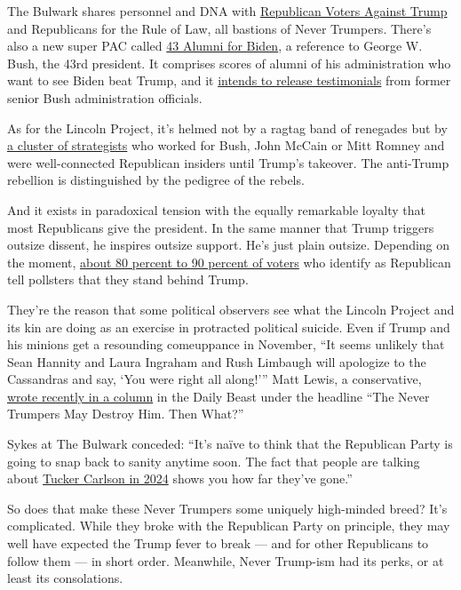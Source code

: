 The Bulwark shares personnel and DNA with
\href{https://rvat.org/}{Republican Voters Against Trump} and
Republicans for the Rule of Law, all bastions of Never Trumpers. There's
also a new super PAC called \href{https://43alumniforjoebiden.com/}{43
Alumni for Biden}, a reference to George W. Bush, the 43rd president. It
comprises scores of alumni of his administration who want to see Biden
beat Trump, and it
\href{https://www.reuters.com/article/us-usa-election-biden-republicans-exclus/exclusive-hundreds-of-george-w-bush-administration-officials-to-back-biden-group-says-idUSKBN24253R}{intends
to release testimonials} from former senior Bush administration
officials.

As for the Lincoln Project, it's helmed not by a ragtag band of
renegades but by \href{https://lincolnproject.us/team/}{a cluster of
strategists} who worked for Bush, John McCain or Mitt Romney and were
well-connected Republican insiders until Trump's takeover. The
anti-Trump rebellion is distinguished by the pedigree of the rebels.

And it exists in paradoxical tension with the equally remarkable loyalty
that most Republicans give the president. In the same manner that Trump
triggers outsize dissent, he inspires outsize support. He's just plain
outsize. Depending on the moment,
\href{https://news.gallup.com/interactives/185273/presidential-job-approval-center.aspx}{about
80 percent to 90 percent of voters} who identify as Republican tell
pollsters that they stand behind Trump.

They're the reason that some political observers see what the Lincoln
Project and its kin are doing as an exercise in protracted political
suicide. Even if Trump and his minions get a resounding comeuppance in
November, ``It seems unlikely that Sean Hannity and Laura Ingraham and
Rush Limbaugh will apologize to the Cassandras and say, `You were right
all along!''' Matt Lewis, a conservative,
\href{https://www.thedailybeast.com/the-never-trumpers-may-destroy-him-then-what}{wrote
recently in a column} in the Daily Beast under the headline ``The Never
Trumpers May Destroy Him. Then What?''

Sykes at The Bulwark conceded: ``It's naïve to think that the Republican
Party is going to snap back to sanity anytime soon. The fact that people
are talking about
\href{https://www.politico.com/news/2020/07/02/tucker-carlson-2024-republicans-348334}{Tucker
Carlson in 2024} shows you how far they've gone.''

So does that make these Never Trumpers some uniquely high-minded breed?
It's complicated. While they broke with the Republican Party on
principle, they may well have expected the Trump fever to break --- and
for other Republicans to follow them --- in short order. Meanwhile,
Never Trump-ism had its perks, or at least its consolations.

